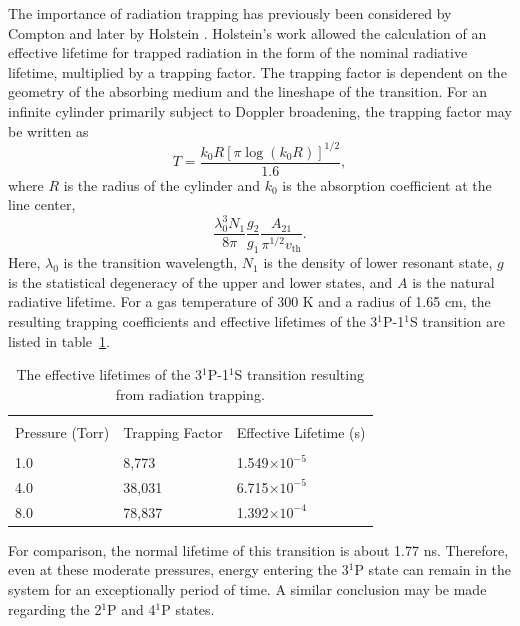The importance of radiation trapping has previously been considered by Compton
\cite{Compton1922} and later by Holstein \cite{Holstein1947, Holstein1951}.
Holstein's work allowed the calculation of an effective lifetime for trapped
radiation in the form of the nominal radiative lifetime, multiplied by a
trapping factor. The trapping factor is dependent on the geometry of the
absorbing medium and the lineshape of the transition. For an infinite cylinder
primarily subject to Doppler broadening, the trapping factor may be written as
\begin{equation}
  T = \frac{k_0R\left[\pi\log(k_0R)\right]^{1/2}}{1.6},
\end{equation}
where $R$ is the radius of the cylinder and $k_0$ is the absorption coefficient
at the line center,
\begin{equation}
  \frac{\lambda_0^3N_1}{8\pi} \frac{g_2}{g_1} \frac{A_{21}}{\pi^{1/2}v_\mathrm{th}}.
\end{equation}
Here, $\lambda_0$ is the transition wavelength, $N_1$ is the density of lower
resonant state, $g$ is the statistical degeneracy of the upper and lower states,
and $A$ is the natural radiative lifetime. For a gas temperature of 300 K and a
radius of 1.65 cm, the resulting trapping coefficients and effective lifetimes
of the 3$^1$P-1$^1$S transition are listed in table~\ref{tbl:lifetimes}.
\begin{table}
  \centering
  \caption{The effective lifetimes of the 3$^1$P-1$^1$S transition resulting
    from radiation trapping.}
  \label{tbl:lifetimes}
  \begin{tabular}{lll}
    \toprule \\
    Pressure (Torr) & Trapping Factor & Effective Lifetime (s) \\
    \midrule \\
    1.0             & 8,773            & 1.549$\times10^{-5}$   \\
    4.0             & 38,031           & 6.715$\times10^{-5}$   \\
    8.0             & 78,837           & 1.392$\times10^{-4}$   \\
    \bottomrule
  \end{tabular}
\end{table}
For comparison, the normal lifetime of this transition is about 1.77 ns.
Therefore, even at these moderate pressures, energy entering the 3$^1$P state
can remain in the system for an exceptionally period of time. A similar
conclusion may be made regarding the 2$^1$P and 4$^1$P states. 

